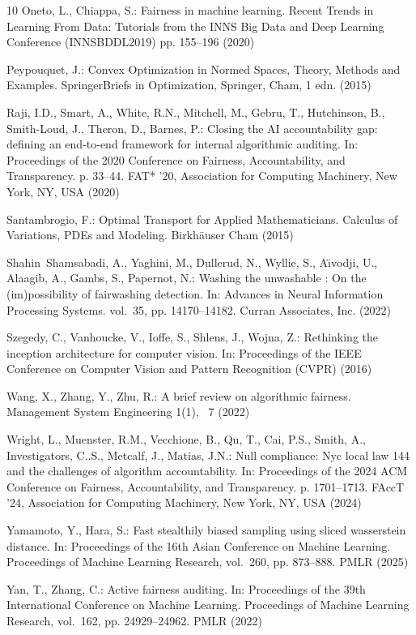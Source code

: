 \documentclass[runningheads, orivec]{llncs}
\begin{document}
\begin{thebibliography}{10}
Oneto, L., Chiappa, S.: Fairness in machine learning. Recent Trends in Learning From Data: Tutorials from the INNS Big Data and Deep Learning Conference (INNSBDDL2019) pp. 155--196 (2020)

Peypouquet, J.: Convex Optimization in Normed Spaces, Theory, Methods and Examples. SpringerBriefs in Optimization, Springer, Cham, 1 edn. (2015)

Raji, I.D., Smart, A., White, R.N., Mitchell, M., Gebru, T., Hutchinson, B., Smith-Loud, J., Theron, D., Barnes, P.: Closing the {AI} accountability gap: defining an end-to-end framework for internal algorithmic auditing. In: Proceedings of the 2020 Conference on Fairness, Accountability, and Transparency. p. 33–44. FAT* '20, Association for Computing Machinery, New York, NY, USA (2020)

Santambrogio, F.: Optimal Transport for Applied Mathematicians. Calculus of Variations, PDEs and Modeling. Birkhäuser Cham (2015)

Shahin~Shamsabadi, A., Yaghini, M., Dullerud, N., Wyllie, S., A\"{\i}vodji, U., Alaagib, A., Gambs, S., Papernot, N.: Washing the unwashable : On the (im)possibility of fairwashing detection. In: Advances in Neural Information Processing Systems. vol.~35, pp. 14170--14182. Curran Associates, Inc. (2022)

Szegedy, C., Vanhoucke, V., Ioffe, S., Shlens, J., Wojna, Z.: Rethinking the inception architecture for computer vision. In: Proceedings of the IEEE Conference on Computer Vision and Pattern Recognition (CVPR) (2016)

Wang, X., Zhang, Y., Zhu, R.: A brief review on algorithmic fairness. Management System Engineering  1(1), ~7 (2022)

Wright, L., Muenster, R.M., Vecchione, B., Qu, T., Cai, P.S., Smith, A., Investigators, C..S., Metcalf, J., Matias, J.N.: Null compliance: Nyc local law 144 and the challenges of algorithm accountability. In: Proceedings of the 2024 ACM Conference on Fairness, Accountability, and Transparency. p. 1701–1713. FAccT '24, Association for Computing Machinery, New York, NY, USA (2024)

Yamamoto, Y., Hara, S.: Fast stealthily biased sampling using sliced wasserstein distance. In: Proceedings of the 16th Asian Conference on Machine Learning. Proceedings of Machine Learning Research, vol.~260, pp. 873--888. PMLR (2025)

Yan, T., Zhang, C.: Active fairness auditing. In: Proceedings of the 39th International Conference on Machine Learning. Proceedings of Machine Learning Research, vol.~162, pp. 24929--24962. PMLR (2022)

\end{thebibliography}
\end{document}
